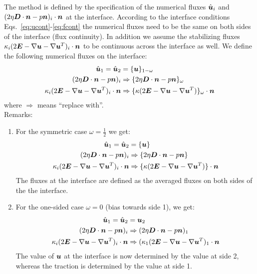 The method is defined by the specification of the numerical fluxes
$\hat{\boldsymbol{u}}_i$ and $(2\eta \boldsymbol{D}\cdot\boldsymbol{n}-p\boldsymbol{n})_i\cdot\boldsymbol{n}$
at the interface.
According to the interface conditions Eqs.~\eqref{eq:ucont}-\eqref{eq:fcont} the
numerical fluxes need to be the same on both sides of the interface (flux
continuity). In
addition we assume the stabilizing fluxes 
$\kappa_i(2\boldsymbol{E} -\nabla \boldsymbol{u}-\nabla\boldsymbol{u}^T)_i\cdot\boldsymbol{n}$
to be continuous across the
interface as well. We define the following numerical fluxes on the interface:
\begin{align}
   \hat{\boldsymbol{u}}_1=\hat{\boldsymbol{u}}_2 &= \{\boldsymbol{u}\}_{1-\omega}\\
(2\eta \boldsymbol{D}\cdot\boldsymbol{n}-p\boldsymbol{n})_i&\Rightarrow
   \{2\eta \boldsymbol{D}\cdot\boldsymbol{n}-p\boldsymbol{n}\}_\omega \\    
   \kappa_i(2\boldsymbol{E} -\nabla \boldsymbol{u}-\nabla\boldsymbol{u}^T)_i\cdot\boldsymbol{n}&\Rightarrow
            \{\kappa(2\boldsymbol{E} -\nabla \boldsymbol{u}-\nabla\boldsymbol{u}^T)\}_\omega\cdot\boldsymbol{n}
\end{align}
where $\Rightarrow$ means ``replace with''.\\
Remarks:
\begin{enumerate}
   \item For the symmetric case $\omega=\frac12$ we get:
\begin{align}
   \hat{\boldsymbol{u}}_1=\hat{\boldsymbol{u}}_2 &= \{\boldsymbol{u}\}\\
(2\eta \boldsymbol{D}\cdot\boldsymbol{n}-p\boldsymbol{n})_i&\Rightarrow
   \{2\eta \boldsymbol{D}\cdot\boldsymbol{n}-p\boldsymbol{n}\}\\    
   \kappa_i(2\boldsymbol{E} -\nabla \boldsymbol{u}-\nabla\boldsymbol{u}^T)_i\cdot\boldsymbol{n}&\Rightarrow
            \{\kappa(2\boldsymbol{E} -\nabla \boldsymbol{u}-\nabla\boldsymbol{u}^T)\}\cdot\boldsymbol{n}
\end{align}
The fluxes at the interface are defined as the averaged fluxes
on both sides of the the interface.
   \item For the one-sided case $\omega=0$ (bias towards side 1), we get:
\begin{align}
   \hat{\boldsymbol{u}}_1=\hat{\boldsymbol{u}}_2 &= \boldsymbol{u}_2\\
(2\eta \boldsymbol{D}\cdot\boldsymbol{n}-p\boldsymbol{n})_i&\Rightarrow
   (2\eta \boldsymbol{D}\cdot\boldsymbol{n}-p\boldsymbol{n})_1\\    
   \kappa_i(2\boldsymbol{E} -\nabla \boldsymbol{u}-\nabla\boldsymbol{u}^T)_i\cdot\boldsymbol{n}&\Rightarrow
            (\kappa_1(2\boldsymbol{E} -\nabla \boldsymbol{u}-\nabla\boldsymbol{u}^T)_1\cdot\boldsymbol{n}
\end{align}
The value of $\boldsymbol{u}$ at the interface is now determined by the value at side 2,
whereas the traction is determined by the value at side 1.
\end{enumerate}

